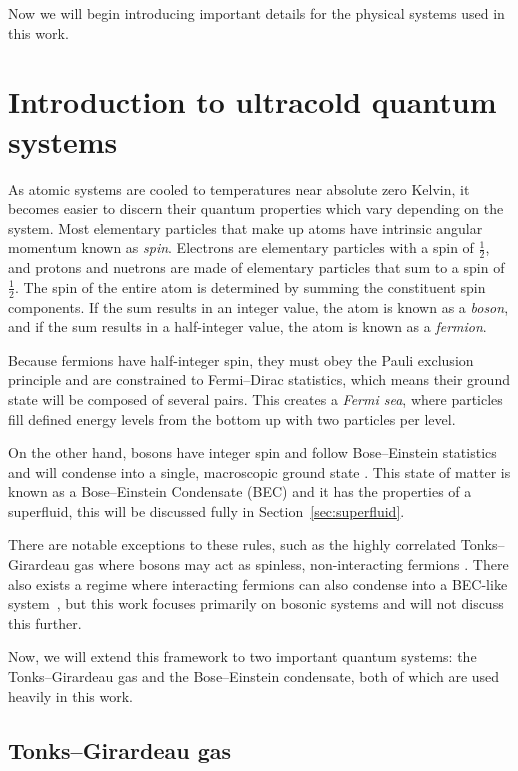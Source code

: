 Now we will begin introducing important details for the physical systems used in this work.

\section{Introduction to ultracold quantum systems}

As atomic systems are cooled to temperatures near absolute zero Kelvin, it becomes easier to discern their quantum properties which vary depending on the system.
Most elementary particles that make up atoms have intrinsic angular momentum known as \textit{spin}.
Electrons are elementary particles with a spin of $\frac{1}{2}$, and protons and nuetrons are made of elementary particles that sum to a spin of $\frac{1}{2}$.
The spin of the entire atom is determined by summing the constituent spin components.
If the sum results in an integer value, the atom is known as a \textit{boson}, and if the sum results in a half-integer value, the atom is known as a \textit{fermion}.

Because fermions have half-integer spin, they must obey the Pauli exclusion principle and are constrained to Fermi--Dirac statistics, which means their ground state will be composed of several pairs.
This creates a \textit{Fermi sea}, where particles fill defined energy levels from the bottom up with two particles per level.

On the other hand, bosons have integer spin and follow Bose--Einstein statistics and will condense into a single, macroscopic ground state \cite{Einstein1925, Fetter2003}.
This state of matter is known as a Bose--Einstein Condensate (BEC) and it has the properties of a superfluid, this will be discussed fully in Section~\ref{sec:superfluid}.

There are notable exceptions to these rules, such as the highly correlated Tonks--Girardeau gas where bosons may act as spinless, non-interacting fermions \cite{Girardeau}.
There also exists a regime where interacting fermions can also condense into a BEC-like system~\cite{Nozieres1985, Bulgac2014}, but this work focuses primarily on bosonic systems and will not discuss this further.

Now, we will extend this framework to two important quantum systems: the Tonks--Girardeau gas and the Bose--Einstein condensate, both of which are used heavily in this work.

\subsection{Tonks--Girardeau gas}

